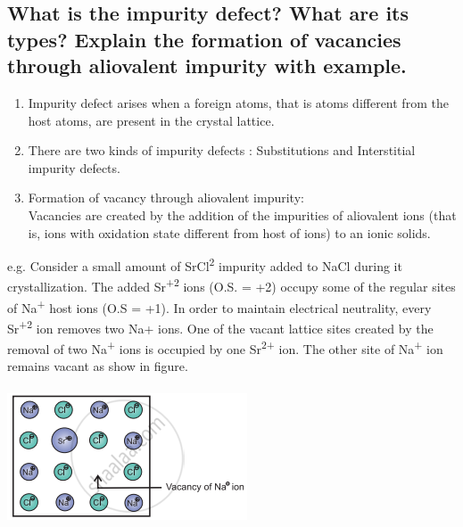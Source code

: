 \documentclass{article}
\begin{document}
   \subsection{What is the impurity defect? What are its types? Explain
   the formation of vacancies through aliovalent impurity with example.}

   \begin{enumerate}
   \item Impurity defect arises when a foreign atoms, that is atoms
   different from the host atoms, are present in the crystal lattice.
   \item There are two kinds of impurity defects : Substitutions and
   Interstitial impurity defects.
   \item Formation of vacancy through aliovalent impurity:\\
   Vacancies are created by the addition of the impurities of
   aliovalent ions (that is, ions with oxidation state different from
   host of ions) to an ionic solids.
   \end{enumerate}

   e.g. Consider a small amount of SrCl\textsuperscript{2} impurity
   added to NaCl during it crystallization. The added 
   Sr\textsuperscript{+2} ions (O.S. = +2) occupy some of the regular
   sites of Na\textsuperscript{+} host ions (O.S = +1). In order to
   maintain electrical neutrality, every Sr\textsuperscript{+2} ion
   removes two Na+ ions. One of the vacant lattice sites created by
   the removal of two Na\textsuperscript{+} ions is occupied by one
   Sr\textsuperscript{2+} ion. The other site of Na\textsuperscript{+}
   ion remains vacant as show in figure.\\\\

   \includegraphics[scale=0.3]{vacan}
   
\end{document}
